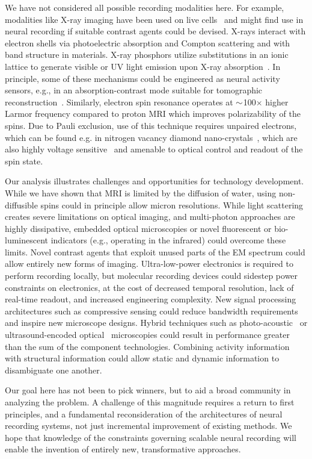 We have not considered all possible recording modalities here.
For example, modalities like X-ray imaging have been used on live cells~\cite{moosmann13} and might find use in neural recording if suitable contrast agents could be devised.
X-rays interact with electron shells via photoelectric absorption and Compton scattering and with band structure in materials.
X-ray phosphors utilize substitutions in an ionic lattice to generate visible or UV light emission upon X-ray absorption~\cite{issler95}.
In principle, some of these mechanisms could be engineered as neural activity sensors, e.g., in an absorption-contrast mode suitable for tomographic reconstruction~\cite{larabell04}.
Similarly, electron spin resonance operates at ${\sim}$100$\times$ higher Larmor frequency compared to proton MRI which improves polarizability of the spins.
Due to Pauli exclusion, use of this technique requires unpaired electrons, which can be found e.g. in nitrogen vacancy diamond nano-crystals~\cite{horowitz12}, which are also highly voltage sensitive~\cite{dolde11} and amenable to optical control and readout of the spin state.

Our analysis illustrates challenges and opportunities for technology development.
While we have shown that MRI is limited by the diffusion of water, using non-diffusible spins could in principle allow micron resolutions.
While light scattering creates severe limitations on optical imaging, and multi-photon approaches are highly dissipative, embedded optical microscopies or novel fluorescent or bio-luminescent indicators (e.g., operating in the infrared) could overcome these limits.
Novel contrast agents that exploit unused parts of the EM spectrum could allow entirely new forms of imaging.
Ultra-low-power electronics is required to perform recording locally, but molecular recording devices could sidestep power constraints on electronics, at the cost of decreased temporal resolution, lack of real-time readout, and increased engineering complexity.
New signal processing architectures such as compressive sensing could reduce bandwidth requirements and inspire new microscope designs.
Hybrid techniques such as photo-acoustic~\cite{filonov12} or ultrasound-encoded optical~\cite{wang12} microscopies could result in performance greater than the sum of the component technologies.
Combining activity information with structural information could allow static and dynamic information to disambiguate one another.

Our goal here has not been to pick winners, but to aid a broad community in analyzing the problem.
A challenge of this magnitude requires a return to first principles, and a fundamental reconsideration of the architectures of neural recording systems, not just incremental improvement of existing methods.
We hope that knowledge of the constraints governing scalable neural recording will enable the invention of entirely new, transformative approaches.


